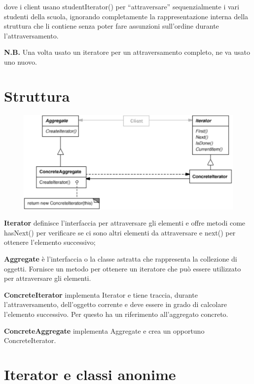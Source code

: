 dove i client usano studentIterator() per “attraversare” sequenzialmente i vari studenti della scuola, ignorando completamente la rappresentazione interna della 
struttura che li contiene senza poter fare assunzioni sull’ordine durante l’attraversamento.

\medskip
\textbf{N.B.} Una volta usato un iteratore per un attraversamento completo, ne va usato uno nuovo.

\section{Struttura}

\begin{figure}[H]
    \centering
    \includegraphics[width=0.5\linewidth]{../../immagini/iterator/struttura_visitor}
\end{figure}

\textbf{Iterator} definisce l'interfaccia per attraversare gli elementi e offre metodi come hasNext() per verificare se ci sono altri elementi da attraversare e next()
per ottenere l'elemento successivo;

\textbf{Aggregate} è l'interfaccia o la classe astratta che rappresenta la collezione di oggetti. 
Fornisce un metodo per ottenere un iteratore che può essere utilizzato per attraversare gli elementi.

\textbf{ConcreteIterator} implementa Iterator e tiene traccia, durante l’attraversamento, dell’oggetto corrente e deve essere in grado di calcolare l’elemento successivo.
Per questo ha un riferimento all’aggregato concreto.

\textbf{ConcreteAggregate} implementa Aggregate e crea un opportuno ConcreteIterator.

\section{Iterator e classi anonime}

